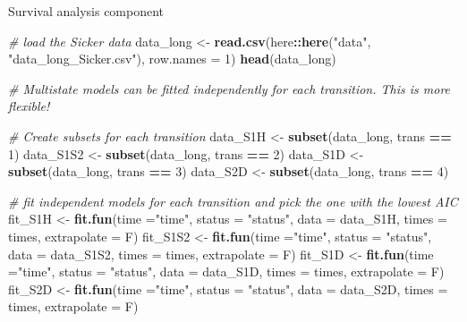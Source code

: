 \documentclass[
]{article}
\newenvironment{Shaded}{\begin{snugshade}}{\end{snugshade}}
\newcommand{\CommentTok}[1]{\textcolor[rgb]{0.56,0.35,0.01}{\textit{#1}}}
\newcommand{\DataTypeTok}[1]{\textcolor[rgb]{0.13,0.29,0.53}{#1}}
\newcommand{\DecValTok}[1]{\textcolor[rgb]{0.00,0.00,0.81}{#1}}
\newcommand{\KeywordTok}[1]{\textcolor[rgb]{0.13,0.29,0.53}{\textbf{#1}}}
\newcommand{\NormalTok}[1]{#1}
\newcommand{\OperatorTok}[1]{\textcolor[rgb]{0.81,0.36,0.00}{\textbf{#1}}}
\newcommand{\StringTok}[1]{\textcolor[rgb]{0.31,0.60,0.02}{#1}}
\begin{document}
Survival analysis component

\begin{Shaded}
\begin{Highlighting}[]
\CommentTok{# load the Sicker data }
\NormalTok{data_long <-}\StringTok{ }\KeywordTok{read.csv}\NormalTok{(here}\OperatorTok{::}\KeywordTok{here}\NormalTok{(}\StringTok{"data"}\NormalTok{, }\StringTok{"data_long_Sicker.csv"}\NormalTok{), }\DataTypeTok{row.names =} \DecValTok{1}\NormalTok{)}
\KeywordTok{head}\NormalTok{(data_long)}

\CommentTok{# Multistate models can be fitted independently for each transition. This is more flexible!}

\CommentTok{# Create subsets for each transition}
\NormalTok{data_S1H  <-}\StringTok{ }\KeywordTok{subset}\NormalTok{(data_long, trans }\OperatorTok{==}\StringTok{ }\DecValTok{1}\NormalTok{)}
\NormalTok{data_S1S2 <-}\StringTok{ }\KeywordTok{subset}\NormalTok{(data_long, trans }\OperatorTok{==}\StringTok{ }\DecValTok{2}\NormalTok{)}
\NormalTok{data_S1D  <-}\StringTok{ }\KeywordTok{subset}\NormalTok{(data_long, trans }\OperatorTok{==}\StringTok{ }\DecValTok{3}\NormalTok{)}
\NormalTok{data_S2D  <-}\StringTok{ }\KeywordTok{subset}\NormalTok{(data_long, trans }\OperatorTok{==}\StringTok{ }\DecValTok{4}\NormalTok{)}

\CommentTok{# fit independent models for each transition and pick the one with the lowest AIC}
\NormalTok{fit_S1H  <-}\StringTok{ }\KeywordTok{fit.fun}\NormalTok{(}\DataTypeTok{time =}\StringTok{"time"}\NormalTok{, }\DataTypeTok{status =} \StringTok{"status"}\NormalTok{, }\DataTypeTok{data =}\NormalTok{ data_S1H, }\DataTypeTok{times =}\NormalTok{ times, }
                    \DataTypeTok{extrapolate =}\NormalTok{ F)}
\NormalTok{fit_S1S2 <-}\StringTok{ }\KeywordTok{fit.fun}\NormalTok{(}\DataTypeTok{time =}\StringTok{"time"}\NormalTok{, }\DataTypeTok{status =} \StringTok{"status"}\NormalTok{, }\DataTypeTok{data =}\NormalTok{ data_S1S2, }\DataTypeTok{times =}\NormalTok{ times, }
                    \DataTypeTok{extrapolate =}\NormalTok{ F)}
\NormalTok{fit_S1D  <-}\StringTok{ }\KeywordTok{fit.fun}\NormalTok{(}\DataTypeTok{time =}\StringTok{"time"}\NormalTok{, }\DataTypeTok{status =} \StringTok{"status"}\NormalTok{, }\DataTypeTok{data =}\NormalTok{ data_S1D, }\DataTypeTok{times =}\NormalTok{ times, }
                    \DataTypeTok{extrapolate =}\NormalTok{ F)}
\NormalTok{fit_S2D  <-}\StringTok{ }\KeywordTok{fit.fun}\NormalTok{(}\DataTypeTok{time =}\StringTok{"time"}\NormalTok{, }\DataTypeTok{status =} \StringTok{"status"}\NormalTok{, }\DataTypeTok{data =}\NormalTok{ data_S2D, }\DataTypeTok{times =}\NormalTok{ times, }
                    \DataTypeTok{extrapolate =}\NormalTok{ F)}


\end{Highlighting}
\end{Shaded}
\end{document}

